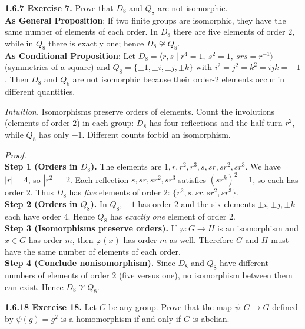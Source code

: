 \documentclass[12pt]{article}
\theoremstyle{definition}
\begin{document}
\newpage

\noindent \textbf{1.6.7 Exercise 7.} Prove that $D_8$ and $Q_8$ are not isomorphic.\\ %

\noindent\textbf{As General Proposition}: If two finite groups are isomorphic, they have the same number of elements of each order. In $D_8$ there are five elements of order $2$, while in $Q_8$ there is exactly one; hence $D_8\not\cong Q_8$.\\

\noindent \textbf{As Conditional Proposition}: Let $D_8=\langle r,s\mid r^4=1,\ s^2=1,\ srs=r^{-1}\rangle$ (symmetries of a square) and $Q_8=\{\pm1,\pm i,\pm j,\pm k\}$ with $i^2=j^2=k^2=ijk=-1$. Then $D_8$ and $Q_8$ are not isomorphic because their order-$2$ elements occur in different quantities.\\

\newpage

\dotfill

\emph{Intuition.} Isomorphisms preserve orders of elements. Count the involutions (elements of order $2$) in each group: $D_8$ has four reflections and the half-turn $r^2$, while $Q_8$ has only $-1$. Different counts forbid an isomorphism.\\

\dotfill

\emph{Proof.}\\
\textbf{Step 1 (Orders in $D_8$).} The elements are $1,r,r^2,r^3,s,sr,sr^2,sr^3$. We have $|r|=4$, so $|r^2|=2$. Each reflection $s,sr,sr^2,sr^3$ satisfies $(sr^k)^2=1$, so each has order $2$. Thus $D_8$ has \emph{five} elements of order $2$: $\{r^2,s,sr,sr^2,sr^3\}$.\\
\textbf{Step 2 (Orders in $Q_8$).} In $Q_8$, $-1$ has order $2$ and the six elements $\pm i,\pm j,\pm k$ each have order $4$. Hence $Q_8$ has \emph{exactly one} element of order $2$.\\
\textbf{Step 3 (Isomorphisms preserve orders).} If $\varphi:G\to H$ is an isomorphism and $x\in G$ has order $m$, then $\varphi(x)$ has order $m$ as well. Therefore $G$ and $H$ must have the same number of elements of each order.\\
\textbf{Step 4 (Conclude nonisomorphism).} Since $D_8$ and $Q_8$ have different numbers of elements of order $2$ (five versus one), no isomorphism between them can exist. Hence $D_8\not\cong Q_8$.

\newpage

\noindent \textbf{1.6.18 Exercise 18.} Let $G$ be any group. Prove that the map $\psi:G\to G$ defined by $\psi(g)=g^{2}$ is a homomorphism if and only if $G$ is abelian.\\ %
\end{document}
